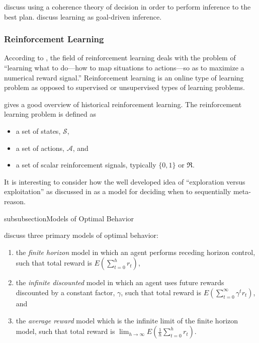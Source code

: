 \cite{thagard:1995} discuss using a coherence theory of decision in order to perform inference to the best plan.
\cite{michalski:1995} discuss learning as goal-driven inference.

\subsubsection{Reinforcement Learning}

According to \cite{sutton:1998}, the field of reinforcement learning deals with the problem of ``learning what to do---how to map situations to actions---so as to maximize a numerical reward signal.''
Reinforcement learning is an online type of learning problem as opposed to supervised or unsupervised types of learning problems.

\cite{kaelbling:1996} gives a good overview of historical reinforcement learning.
The reinforcement learning problem is defined as

\begin{itemize}
\item{a set of states, $\mathcal{S}$,}
\item{a set of actions, $\mathcal{A}$, and}
\item{a set of scalar reinforcement signals, typically $\{0,1\}$ or $\Re$.}
\end{itemize}

It is interesting to consider how the well developed idea of ``exploration versus exploitation'' as discussed in \cite{kaelbling:1996} as a model for deciding when to sequentially meta-reason.

subsubsection{Models of Optimal Behavior}

\cite{kaelbling:1996} discuss three primary models of optimal behavior:

\begin{enumerate}
\item{the \emph{finite horizon} model in which an agent performs receding horizon control, such that total reward is $E(\sum_{t=0}^{h}{r_t})$,}
\item{the \emph{infinite discounted} model in which an agent uses future rewards discounted by a constant factor, $\gamma$, such that total reward is $E(\sum_{t=0}^{\infty}{\gamma^t r_t})$, and}
\item{the \emph{average reward} model which is the infinite limit of the finite horizon model, such that total reward is $\lim_{h{\rightarrow}\infty}{E(\frac{1}{h}\sum_{t=0}^{h}{r_t})}$.}
\end{enumerate}

